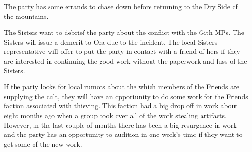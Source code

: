 The party has some errands to chase down before returning to the Dry Side of the mountains.

The Sisters want to debrief the party about the conflict with the Gith MPs.
The Sisters will issue a demerit to Ora due to the incident.
The local Sisters representative will offer to put the party in contact with a friend of hers if they are interested in continuing the good work without the paperwork and fuss of the Sisters.

If the party looks for local rumors about the which members of the Friends are supplying the cult, they will have an opportunity to do some work for the Friends faction associated with thieving.
This faction had a big drop off in work about eight months ago when a group took over all of  the work stealing artifacts.
However, in the last couple of months there has been a big resurgence in work and the party has an opportunity to audition in one week's time if they want to get some of the new work.
